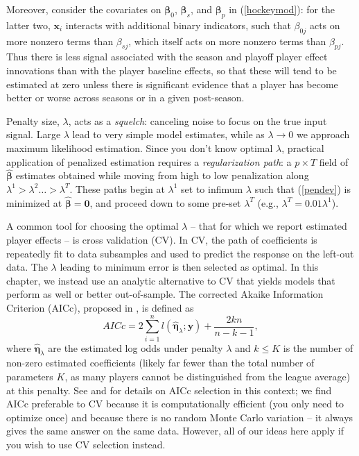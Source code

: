 Moreover, consider the covariates on $\boldsymbol{\beta}_0$,
$\boldsymbol{\beta}_s$, and $\boldsymbol{\beta}_p$ in (\ref{hockeymod}): for the latter two,
 $\mathbf{x}_i$ interacts with additional binary indicators, such that
$\beta_{0j}$ acts on more nonzero terms than $\beta_{sj}$, which itself acts
on more nonzero terms than $\beta_{pj}$.  Thus there is  less signal
associated with the season and playoff player effect innovations than with the
player baseline effects, so that these will tend to be estimated at zero unless
there is significant evidence that a player has become better or worse across
seasons or in a given post-season.

Penalty size, $\lambda$, acts as a {\it squelch}: canceling noise to
focus on the true input signal. Large $\lambda$ lead to very simple  model
estimates, while as $\lambda \rightarrow 0$ we approach maximum likelihood
estimation. Since you don't know optimal $\lambda$, practical
application of penalized estimation requires a {\it regularization path}: a $p
\times T$ field of $\boldsymbol{\hat\beta}$ estimates obtained while moving
from high to low penalization along $\lambda^1 > \lambda^2 \ldots >
\lambda^T$. These paths begin at $\lambda^1$ set to infimum $\lambda$ such
that (\ref{pendev}) is minimized at $\boldsymbol{\hat\beta} = \mathbf{0}$, and proceed
down to some pre-set $\lambda^T$ (e.g., $\lambda^T= 0.01\lambda^1$).

 A common tool for choosing the optimal $\lambda$ -- that for which we report
 estimated player effects -- is cross validation (CV).  In CV, the path of
 coefficients is repeatedly fit to data subsamples and used to predict the
 response on the left-out data. The $\lambda$ leading to minimum error is then
 selected as optimal.  In this chapter, we instead use an analytic alternative
 to CV that yields models that perform as well or better out-of-sample.   The
 corrected Akaike Information Criterion (AICc), proposed in
 \cite{hurvich_regression_1989}, is defined as
\begin{equation*}
AICc = 2\sum_{i=1}^{n} l(\boldsymbol{\hat\eta}_{\lambda};\mathbf{y}) + \frac{2kn}{n-k-1},
\end{equation*}
where $\boldsymbol{\hat\eta}_{\lambda}$ are the estimated log odds under
penalty $\lambda$ and $k \leq K$ is the number of non-zero estimated
coefficients (likely far fewer than the total number of parameters $K$, as
many players cannot be distinguished from the league average) at this penalty.
See \cite{taddy_one-step_2015} and \cite{flynn_efficiency_2013} for details on
AICc selection in this context; we find AICc preferable to CV because it is
computationally efficient (you only need to optimize once) and because there
is no random Monte Carlo variation -- it always gives the same answer on the
same data.  However, all of our ideas here apply if you wish to use CV
selection instead.

